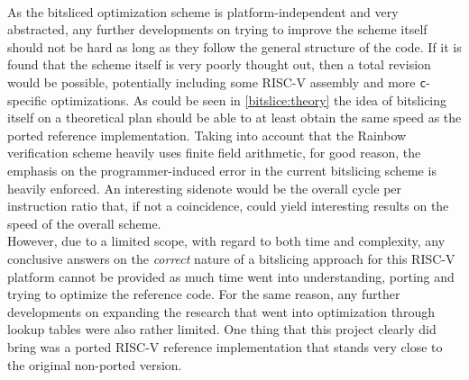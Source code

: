 \medskip\\
As the bitsliced optimization scheme is platform-independent and very abstracted, any further developments on trying to improve the scheme itself should not be hard as long as they follow the general structure of the code. If it is found that the scheme itself is very poorly thought out, then a total revision would be possible, potentially including some RISC-V assembly and more \texttt{c}-specific optimizations. As could be seen in \cref{bitslice:theory} the idea of bitslicing itself on a theoretical plan should be able to at least obtain the same speed as the ported reference implementation. Taking into account that the Rainbow verification scheme heavily uses finite field arithmetic, for good reason, the emphasis on the programmer-induced error in the current bitslicing scheme is heavily enforced. An interesting sidenote would be the overall cycle per instruction ratio that, if not a coincidence, could yield interesting results on the speed of the overall scheme.
\medskip\\
However, due to a limited scope, with regard to both time and complexity, any conclusive answers on the \emph{correct} nature of a bitslicing approach for this RISC-V platform cannot be provided as much time went into understanding, porting and trying to optimize the reference code. For the same reason, any further developments on expanding the research that went into optimization through lookup tables were also rather limited. One thing that this project clearly did bring was a ported RISC-V reference implementation that stands very close to the original non-ported version.
\pagebreak